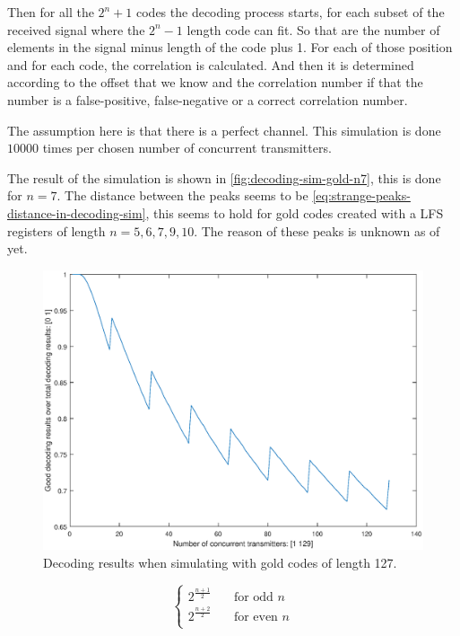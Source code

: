 		Then for all the $2^n +1$ codes the decoding process starts, for each subset of the received signal where the $2^n - 1$ length code can fit.
		So that are the number of elements in the signal minus length of the code plus 1.
		For each of those position and for each code, the correlation is calculated.
		And then it is determined according to the offset that we know and the correlation number if that the number is a false-positive, false-negative or a correct correlation number.

		The assumption here is that there is a perfect channel.
		This simulation is done $10000$ times per chosen number of concurrent transmitters.


		The result of the simulation is shown in \autoref{fig:decoding-sim-gold-n7}, this is done for $n = 7$.
		The distance between the peaks seems to be \autoref{eq:strange-peaks-distance-in-decoding-sim}, this seems to hold for gold codes created with a LFS registers of length $n = 5, 6, 7, 9, 10$.
		The reason of these peaks is unknown as of yet.


		\begin{figure}
			\centering
			\includegraphics[width=\textwidth]{chapters/decoding-sim-gold-n7.eps}
			\caption{Decoding results when simulating with gold codes of length 127.}
			\label{fig:decoding-sim-gold-n7}
		\end{figure}

		\begin{equation}
			\label{eq:strange-peaks-distance-in-decoding-sim}
				\begin{cases}
					2^{\frac{n+1}{2}} & \quad \text{for odd } n \\
					2^{\frac{n+2}{2}} & \quad \text{for even } n \\
				\end{cases}
		\end{equation}

